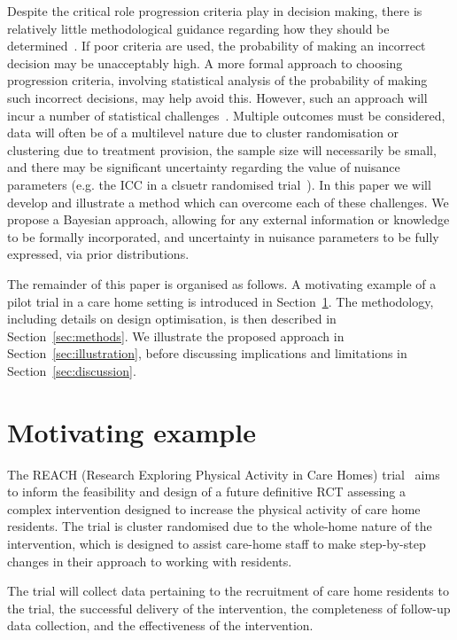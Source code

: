 \documentclass{article} %
\begin{document}
Despite the critical role progression criteria play in decision making, there is relatively little methodological guidance regarding how they should be determined~\cite{Avery2017}. If poor criteria are used, the probability of making an incorrect decision may be unacceptably high. A more formal approach to choosing progression criteria, involving statistical analysis of the probability of making such incorrect decisions, may help avoid this. However, such an approach will incur a number of statistical challenges~\cite{Wilson2015}. Multiple outcomes must be considered, data will often be of a multilevel nature due to cluster randomisation or clustering due to treatment provision, the sample size will necessarily be small, and there may be significant uncertainty regarding the value of nuisance parameters (e.g. the ICC in a clsuetr randomised trial~\cite{Eldridge2015}). In this paper we will develop and illustrate a method which can overcome each of these challenges. We propose a Bayesian approach, allowing  for any external information or knowledge to be formally incorporated, and uncertainty in nuisance parameters to be fully expressed, via prior distributions.

The remainder of this paper is organised as follows. A motivating example of a pilot trial in a care home setting is introduced in Section~\ref{sec:motivating example}. The methodology, including details on design optimisation, is then described in Section~\ref{sec:methods}. We illustrate the proposed approach in Section~\ref{sec:illustration}, before discussing implications and limitations in Section~\ref{sec:discussion}.

\section{Motivating example}\label{sec:motivating example}

The REACH (Research Exploring Physical Activity in Care Homes) trial~\cite{Forster2017} aims to inform the feasibility and design of a future definitive RCT assessing a complex intervention designed to increase the physical activity of care home residents. The trial is cluster randomised due to the whole-home nature of the intervention, which is designed to assist care-home staff to make step-by-step changes in their approach to working with residents.

The trial will collect data pertaining to the recruitment of care home residents to the trial, the successful delivery of the intervention, the completeness of follow-up data collection, and the effectiveness of the intervention.
\end{document}

